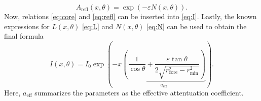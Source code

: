 \begin{equation}
    A_\text{refl}(x, \theta) = \exp{\left(- \varepsilon N(x, \theta)\right)} .
    \label{eq:refl}
\end{equation}
Now, relations \eqref{eq:core} and \eqref{eq:refl} can be inserted into \eqref{eq:I}. Lastly, the known expressions
for $L(x, \theta)$ \eqref{eq:L} and $N(x, \theta)$ \eqref{eq:N} can be used to obtain the final formula
\begin{equation}
    I(x, \theta) = I_0 \exp{ \left( -x \underbrace{\left(\frac{1}{\cos{\theta}} + \frac{\varepsilon \tan{\theta}}{2 \sqrt{r_\text{core}^2-r_\text{min}^2}} \right)}_{a_\text{eff}} \right)} .
    \label{eq:Attentuation}
\end{equation}
Here, $a_\text{eff}$ summarizes the parameters as the effective attentuation coefficient.